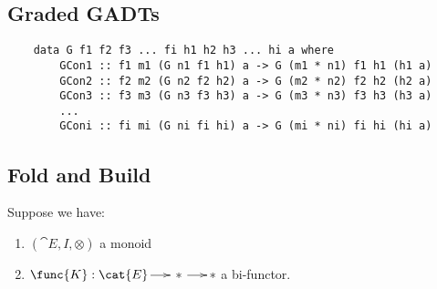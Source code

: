 \subsection{Graded GADTs}
\label{subsec:graded_gadts}

\begin{verbatim}
    data G f1 f2 f3 ... fi h1 h2 h3 ... hi a where
        GCon1 :: f1 m1 (G n1 f1 h1) a -> G (m1 * n1) f1 h1 (h1 a)
        GCon2 :: f2 m2 (G n2 f2 h2) a -> G (m2 * n2) f2 h2 (h2 a)
        GCon3 :: f3 m3 (G n3 f3 h3) a -> G (m3 * n3) f3 h3 (h3 a)
        ...
        GConi :: fi mi (G ni fi hi) a -> G (mi * ni) fi hi (hi a)
\end{verbatim} 


\subsection{Fold and Build}
\label{subsec:fold_and_build}
Suppose we have:
\begin{center}
    \begin{enumerate}[label=\roman*.]
        \item $(\cat{E},I,\otimes)$ a monoid
        \item $\func{K} : \cat{E} \to * \to *$ a bi-functor.
    \end{enumerate}
\end{center}
